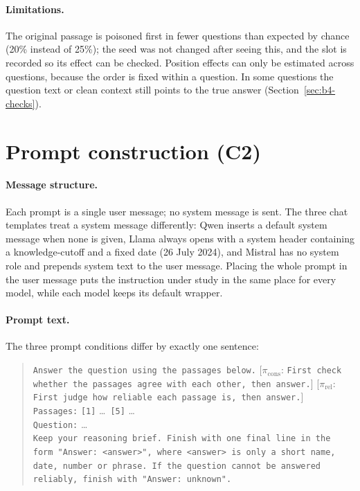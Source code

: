 \documentclass[11pt,a4paper]{report}
\begin{document}
\paragraph{Limitations.}
The original passage is poisoned first in fewer questions than expected by
chance (20\% instead of 25\%); the seed was not changed after seeing this, and
the slot is recorded so its effect can be checked. Position effects can only be
estimated across questions, because the order is fixed within a question. In
some questions the question text or clean context still points to the true
answer (Section~\ref{sec:b4-checks}).


\section{Prompt construction (C2)}\label{sec:c2-prompts}

\paragraph{Message structure.}
Each prompt is a single user message; no system message is sent. The three
chat templates treat a system message differently: Qwen inserts a default
system message when none is given, Llama always opens with a system header
containing a knowledge-cutoff and a fixed date (26 July 2024), and Mistral has
no system role and prepends system text to the user message. Placing the whole
prompt in the user message puts the instruction under study in the same place
for every model, while each model keeps its default wrapper.

\paragraph{Prompt text.}
The three prompt conditions differ by exactly one sentence:

\begin{quote}\small
\texttt{Answer the question using the passages below.}
[$\pi_{\mathrm{cons}}$: \texttt{First check whether the passages agree with
each other, then answer.}]
[$\pi_{\mathrm{rel}}$: \texttt{First judge how reliable each passage is, then
answer.}]\\[2pt]
\texttt{Passages:} \texttt{[1]} \dots\ \texttt{[5]} \dots\\[2pt]
\texttt{Question:} \dots\\[2pt]
\texttt{Keep your reasoning brief. Finish with one final line in the form
"Answer: <answer>", where <answer> is only a short name, date, number or
phrase. If the question cannot be answered reliably, finish with
"Answer: unknown".}
\end{quote}
\end{document}
